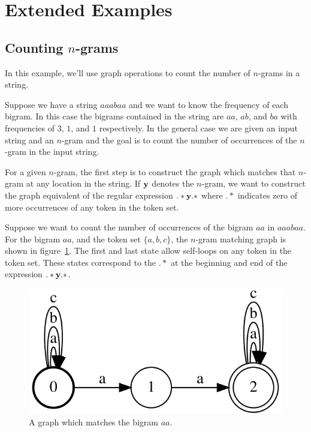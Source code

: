 \section{Extended Examples}
\label{sec:extended_examples}

\subsection{Counting $n$-grams}

In this example, we'll use graph operations to count the number of $n$-grams in
a string.

Suppose we have a string $aaabaa$ and we want to know the frequency of each
bigram. In this case the bigrams contained in the string are $aa$, $ab$, and
$ba$ with frequencies of $3$, $1$, and $1$ respectively. In the general case we
are given an input string and an $n$-gram and the goal is to count the number
of occurrences of the $n$-gram in the input string.

For a given $n$-gram, the first step is to construct the graph which matches
that $n$-gram at any location in the string. If ${\bf y}$ denotes the $n$-gram, we
want to construct the graph equivalent of the regular expression $.*{\bf y}.*$
where $.*$ indicates zero of more occurrences of any token in the token set.

Suppose we want to count the number of occurrences of the bigram $aa$ in
$aaabaa$. For the bigram $aa$, and the token set $\{a, b, c\}$, the $n$-gram
matching graph is shown in figure~\ref{fig:bigram_aa}. The first and last state
allow self-loops on any token in the token set. These states correspond to the
$.*$ at the beginning and end of the expression $.*{\bf y}.*$.

\begin{figure}
    \centering
    \includegraphics[scale=\dotscale]{figures/bigram_aa}
    \caption{A graph which matches the bigram $aa$.}
    \label{fig:bigram_aa}
\end{figure}

